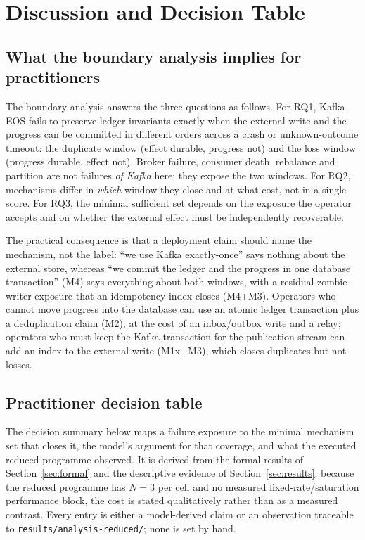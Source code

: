 \section{Discussion and Decision Table}
\label{sec:decision}

\subsection{What the boundary analysis implies for practitioners}
\label{sec:dec-implications}

The boundary analysis answers the three questions as follows. For RQ1, Kafka EOS fails to
preserve ledger invariants exactly when the external write and the progress can be committed in
different orders across a crash or unknown-outcome timeout: the duplicate window (effect durable,
progress not) and the loss window (progress durable, effect not). Broker failure, consumer death,
rebalance and partition are not failures \emph{of Kafka} here; they expose the two windows. For
RQ2, mechanisms differ in \emph{which} window they close and at what cost, not in a single score.
For RQ3, the minimal sufficient set depends on the exposure the operator accepts and on whether
the external effect must be independently recoverable.

The practical consequence is that a deployment claim should name the mechanism, not the label:
``we use Kafka exactly-once'' says nothing about the external store, whereas ``we commit the
ledger and the progress in one database transaction'' (M4) says everything about both windows,
with a residual zombie-writer exposure that an idempotency index closes (M4+M3). Operators who
cannot move progress into the database can use an atomic ledger transaction plus a deduplication
claim (M2), at the cost of an inbox/outbox write and a relay; operators who must keep the Kafka
transaction for the publication stream can add an index to the external write (M1x+M3), which
closes duplicates but not losses.

\subsection{Practitioner decision table}
\label{sec:dec-table}

The decision summary below maps a failure exposure to the minimal mechanism set that closes it, the
model's argument for that coverage, and what the executed reduced programme observed. It is
derived from the formal results of Section~\ref{sec:formal} and the descriptive evidence of
Section~\ref{sec:results}; because the reduced programme has $N=3$ per cell and no measured
fixed-rate/saturation performance block, the cost is stated qualitatively rather than as a
measured contrast. Every entry is either a model-derived claim or an observation traceable to
\texttt{results/analysis-reduced/}; none is set by hand.

